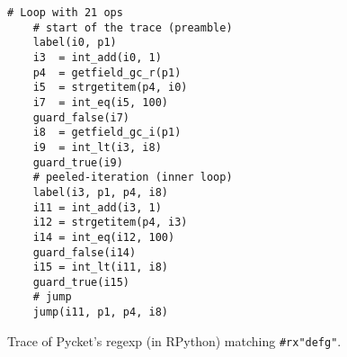 \begin{figure}[!htbp]
	\centering

	\begin{minipage}{0.3\textwidth}
		\begin{lstlisting}[language=rptrace, basicstyle=\ttfamily\scriptsize]
    # Loop with 21 ops
    # start of the trace (preamble)
    label(i0, p1)
    i3  = int_add(i0, 1)
    p4  = getfield_gc_r(p1)
    i5  = strgetitem(p4, i0)
    i7  = int_eq(i5, 100)
    guard_false(i7)
    i8  = getfield_gc_i(p1)
    i9  = int_lt(i3, i8)
    guard_true(i9)
    # peeled-iteration (inner loop)
    label(i3, p1, p4, i8)
    i11 = int_add(i3, 1)
    i12 = strgetitem(p4, i3)
    i14 = int_eq(i12, 100)
    guard_false(i14)
    i15 = int_lt(i11, i8)
    guard_true(i15)
    # jump
    jump(i11, p1, p4, i8)
		\end{lstlisting}
	\end{minipage}
\caption{\small Trace of Pycket's regexp (in RPython) matching
		{\tt\#rx"defg"}.}
\label{fig:regexp-example-trace}
\end{figure}